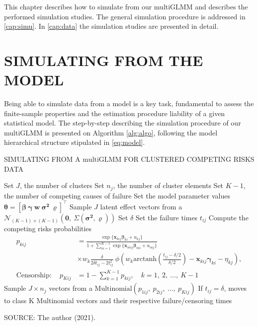 This chapter describes how to simulate from our multiGLMM and describes
the performed simulation studies. The general simulation procedure is
addressed in \autoref{cap:simu}. In \autoref{cap:data} the simulation
studies are presented in detail.

\section{SIMULATING FROM THE MODEL}
\label{cap:simu}

Being able to simulate data from a model is a key task, fundamental to
assess the finite-sample properties and the estimation procedure
liability of a given statistical model. The step-by-step describing the
simulation procedure of our multiGLMM is presented on Algorithm
\autoref{alg:algo}, following the model hierarchical structure
stipulated in \autoref{eq:model}.

\begin{algorithm}[H]
 \caption{SIMULATING FROM A \(\text{multiGLMM}\) FOR CLUSTERED COMPETING
          RISKS DATA}
 \label{alg:algo}
 \begin{algorithmic}[1]
  \State
   Set \(J\), the number of clusters
  \State
   Set \(n_{j}\), the number of cluster elements
  \State
   Set \(K-1\), the number of competing causes of failure
  \State
   Set the model parameter values \(\bm{\theta} =
   [\bm{\beta}~\bm{\gamma}~\bm{w}~\bm{\sigma^{2}}~\bm{\varrho}]^{\top}\)
  \State
   Sample \(J\) latent effect vectors from a
   \(\mathcal{N}_{(K-1)\times(K-1)}(\bm{0},~\Sigma(\bm{\sigma^{2}},
     \bm{\varrho}))\)
  \State
   Set \(\delta\)
  \State
   Set the failure times \(t_{ij}\)
  \State
   Compute the competing risks probabilities
   \begin{align*}
    p_{kij} &=
    \frac{\exp\{\bm{x}_{kij}\bm{\beta}_{ki} + u_{kj}\}}{
          1 +
          \sum_{m=1}^{K-1}\exp\{\bm{x}_{mij}\bm{\beta}_{mi} + u_{mj}\}
         }\\
    &\times w_{k}\frac{\delta}{2\delta t_{ij} - 2t_{ij}^{2}}~
     \phi\left(w_{k}
      \text{arctanh}\left(\frac{t_{ij}-\delta/2}{\delta/2}\right) -
      \bm{x}_{kij}\bm{\gamma}_{ki} - \eta_{kj}
     \right),\\
    \text{Censorship}: \quad
    p_{Kij} &=
    1 - \sum_{k=1}^{K-1} p_{kij}, \quad k = 1,~2,~\dots,~K-1
   \end{align*}
  \State
   Sample \(J\times n_{j}\) vectors from a
   \(\text{Multinomial}(p_{1ij},~p_{2ij},~\dots,~p_{Kij})\)
  \State
   If \(t_{ij} = \delta\), moves to class K
  \State
   \Return
    Multinomial vectors and their respective failure/censoring times
 \end{algorithmic}
\end{algorithm}
\vspace{-1cm}
\begin{footnotesize}
  \begin{center}
    SOURCE: The author (2021).
  \end{center}
\end{footnotesize}

